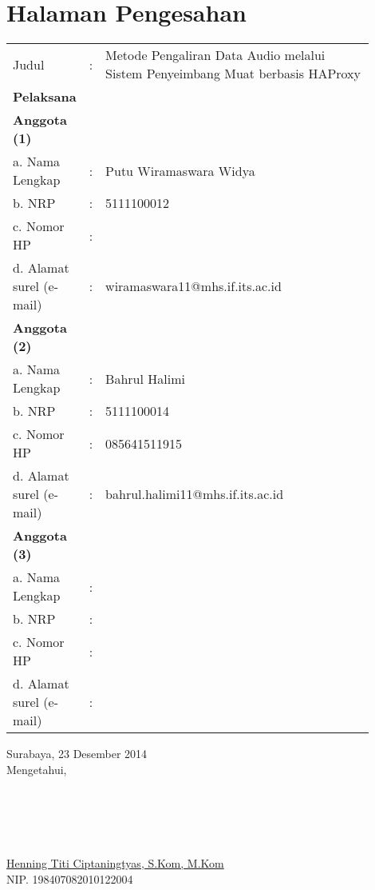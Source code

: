 \chapter{Halaman Pengesahan}
\begin{tabular}{llp{0.9\linewidth}}
Judul & : & Metode Pengaliran Data Audio melalui Sistem Penyeimbang Muat berbasis HAProxy 
\\
\textbf{Pelaksana} \\
\textbf{Anggota (1)} \\
a. Nama Lengkap & : & Putu Wiramaswara Widya\\
b. NRP & :&5111100012\\
c. Nomor HP & :&\\
d. Alamat surel (e-mail) & :&wiramaswara11@mhs.if.its.ac.id\\
\textbf{Anggota (2)} \\
a. Nama Lengkap & :&Bahrul Halimi\\
b. NRP & :&5111100014\\
c. Nomor HP & :&085641511915\\
d. Alamat surel (e-mail) & :&bahrul.halimi11@mhs.if.its.ac.id\\
\textbf{Anggota (3)} \\
a. Nama Lengkap & :&\\
b. NRP & :&\\
c. Nomor HP & :&\\
d. Alamat surel (e-mail) & :&\\
\end{tabular}

\begin{center}
    Surabaya, 23 Desember 2014 \\
    Mengetahui,	\\
    \ \\
    \ \\
    \ \\
    \ \\
    \ \\
    \underline{Henning Titi Ciptaningtyas, S.Kom, M.Kom} \\
    NIP. 198407082010122004
\end{center}


